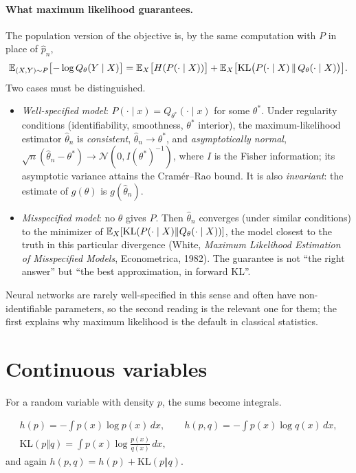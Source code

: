 \begin{notechapter}
\paragraph{What maximum likelihood guarantees.} The population version of the
objective is, by the same computation with $P$ in place of $\hat p_n$,
\[
  \mathbb{E}_{(X,Y)\sim P}\bigl[-\log Q_\theta(Y\mid X)\bigr]
  = \mathbb{E}_X\bigl[H(P(\cdot\mid X))\bigr] + \mathbb{E}_X\bigl[\mathrm{KL}\bigl(P(\cdot\mid X)\,\Vert\,Q_\theta(\cdot\mid X)\bigr)\bigr].
\] Two cases must be distinguished.
\begin{itemize}[nosep]
  \item \emph{Well-specified model}: $P(\cdot\mid x) = Q_{\theta^*}(\cdot\mid x)$ for some $\theta^*$. Under
        regularity conditions (identifiability, smoothness, $\theta^*$ interior), the
        maximum-likelihood estimator $\hat\theta_n$ is \emph{consistent},
        $\hat\theta_n\to\theta^*$, and \emph{asymptotically normal},
        $\sqrt n(\hat\theta_n - \theta^*)\to\mathcal N(0, I(\theta^*)^{-1})$, where $I$ is the Fisher
        information; its asymptotic variance attains the Cramér--Rao bound. It is
        also \emph{invariant}: the estimate of $g(\theta)$ is $g(\hat\theta_n)$.
  \item \emph{Misspecified model}: no $\theta$ gives $P$. Then $\hat\theta_n$ converges (under
        similar conditions) to the minimizer of $\mathbb{E}_X[\mathrm{KL}(P(\cdot\mid X)\Vert Q_\theta(\cdot\mid X))]$, the
        model closest to the truth in this particular divergence (White, \emph{Maximum Likelihood
        Estimation of Misspecified Models}, Econometrica, 1982). The
        guarantee is not ``the right answer'' but ``the best approximation, in
        forward KL''.
\end{itemize}
Neural networks are rarely well-specified in this sense and often have
non-identifiable parameters, so the second reading is the relevant one for
them; the first explains why maximum likelihood is the default in classical
statistics.

\section{Continuous variables}\label{cross-entropy:sec:continuous}

For a random variable with density $p$, the sums become integrals.

\begin{definition}
\begin{gather*}
  h(p) = -\int p(x)\log p(x)\,dx,\qquad
  h(p, q) = -\int p(x)\log q(x)\,dx,\\
  \mathrm{KL}(p\Vert q) = \int p(x)\log\frac{p(x)}{q(x)}\,dx,
\end{gather*}
and again $h(p, q) = h(p) + \mathrm{KL}(p\Vert q)$.
\end{definition}


\end{notechapter}
